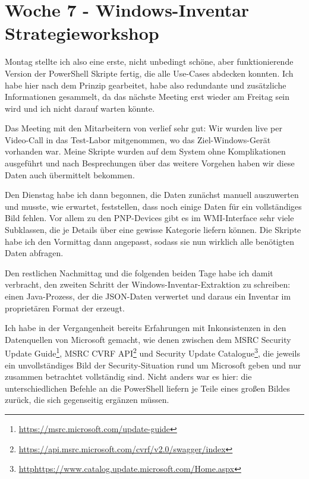 \section{Woche 7 - Windows-Inventar \headerand Strategieworkshop} \label{sec:bericht-wo-7}

Montag stellte ich also eine erste, nicht unbedingt schöne, aber funktionierende Version der PowerShell Skripte fertig, die alle Use-Cases abdecken konnten.
Ich habe hier nach dem Prinzip  gearbeitet, habe also redundante und zusätzliche Informationen gesammelt, da das nächste Meeting erst wieder am Freitag sein wird und ich nicht darauf warten könnte.

Das Meeting mit den Mitarbeitern von {\aeclientZEZESE} verlief sehr gut:
Wir wurden live per Video-Call in das Test-Labor mitgenommen, wo das Ziel-Windows-Gerät vorhanden war.
Meine Skripte wurden auf dem System ohne Komplikationen ausgeführt und nach Besprechungen über das weitere Vorgehen haben wir diese Daten auch übermittelt bekommen.

Den Dienstag habe ich dann begonnen, die Daten zunächst manuell auszuwerten und musste, wie erwartet, feststellen, dass noch einige Daten für ein vollständiges Bild fehlen.
Vor allem zu den PNP-Devices gibt es im WMI-Interface sehr viele Subklassen, die je Details über eine gewisse Kategorie liefern können.
Die Skripte habe ich den Vormittag dann angepasst, sodass sie nun wirklich alle benötigten Daten abfragen.

Den restlichen Nachmittag und die folgenden beiden Tage habe ich damit verbracht, den zweiten Schritt der Windows-Inventar-Extraktion zu schreiben:
einen Java-Prozess, der die JSON-Daten verwertet und daraus ein Inventar im proprietären Format der {\metaeffekt} erzeugt.

Ich habe in der Vergangenheit bereits Erfahrungen mit Inkonsistenzen in den Datenquellen von Microsoft gemacht, wie denen zwischen dem
MSRC Security Update Guide\footnote{\url{https://msrc.microsoft.com/update-guide}},
MSRC CVRF API\footnote{\url{https://api.msrc.microsoft.com/cvrf/v2.0/swagger/index}} und
Security Update Catalogue\footnote{\url{httphttps://www.catalog.update.microsoft.com/Home.aspx}},
die jeweils ein unvollständiges Bild der Security-Situation rund um Microsoft geben und nur zusammen betrachtet vollständig sind.
Nicht anders war es hier:
die unterschiedlichen Befehle an die PowerShell liefern je Teile eines großen Bildes zurück, die sich gegenseitig ergänzen müssen.

